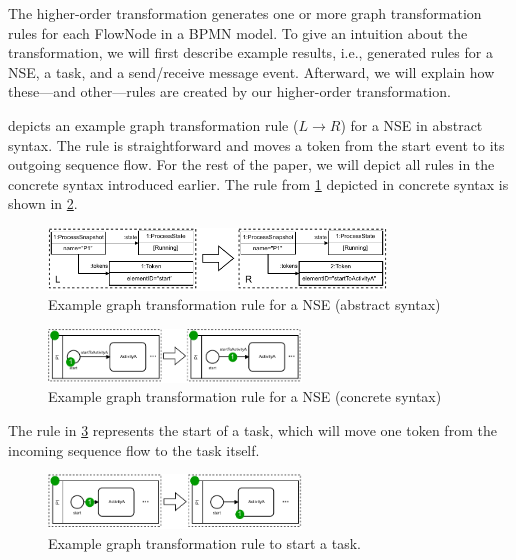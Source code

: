 \documentclass[submission, copyright, creativecommons]{eptcs}
\begin{document}
The higher-order transformation generates one or more graph transformation rules for each \textsf{FlowNode} in a BPMN model.
To give an intuition about the transformation, we will first describe example results, i.e., generated rules for a NSE, a task, and a send/receive message event.
Afterward, we will explain how these---and other---rules are created by our higher-order transformation.

 depicts an example graph transformation rule ($L \to R$) for a NSE in abstract syntax.
The rule is straightforward and moves a token from the start event to its outgoing sequence flow.
For the rest of the paper, we will depict all rules in the concrete syntax introduced earlier.
The rule from \cref{fig:gtRuleAbstract} depicted in concrete syntax is shown in \cref{fig:gtRuleConcrete}.

\begin{figure}[h]
    \centering
  \includegraphics[width=0.8\textwidth]{images/rule_abstract.pdf}
  \caption{Example graph transformation rule for a NSE (abstract syntax)}  \label{fig:gtRuleAbstract}
\end{figure}

\begin{figure}[h]
    \centering
  \includegraphics[width=0.6\textwidth]{images/rule_concrete.pdf}
  \caption{Example graph transformation rule for a NSE (concrete syntax)}
  \label{fig:gtRuleConcrete}
\end{figure}

The rule in \cref{fig:taskRules} represents the start of a task, which will move one token from the incoming sequence flow to the task itself.

\begin{figure}[h]
    \centering
    \includegraphics[width=0.6\textwidth]{images/bpmn_semantics-rules.pdf}
    \caption{Example graph transformation rule to start a task.}
    \label{fig:taskRules}
\end{figure}
\end{document}
